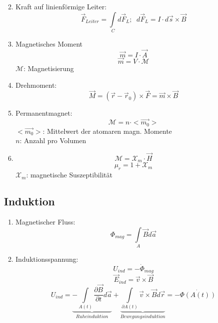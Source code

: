 \documentclass[a4paper,twocolumn,10pt]{article}
\begin{document}
\begin{enumerate}[label=$\bullet$]
\begin{equation*}
\end{equation*}
\item Kraft auf linienförmige Leiter:
\begin{equation*}
\overrightarrow{F}_{Leiter}=\int\limits_{C}d\overrightarrow{F}_L;\;\;d\overrightarrow{F}_L=I\cdot d\overrightarrow{s}\times\overrightarrow{B}
\end{equation*}
\item Magnetisches Moment
\begin{equation*}
\overrightarrow{m}=I\cdot\overrightarrow{A}
\end{equation*}
\begin{equation*}
\overrightarrow{m}=V\cdot\mathcal{M}
\end{equation*}
$\mathcal{M}$: Magnetisierung
\item Drehmoment:
\begin{equation*}
\overrightarrow{M}=(\overrightarrow{r}-\overrightarrow{r}_0)\times\overrightarrow{F}=\overrightarrow{m}\times\overrightarrow{B}
\end{equation*}
\item Permanentmagnet:
\begin{equation*}
\mathcal{M}=n\cdot <\overrightarrow{m_0}>
\end{equation*}
$<\overrightarrow{m_0}>$: Mittelwert der atomaren magn. Momente\\
$n$: Anzahl pro Volumen\\
\item 
\begin{equation*}
\mathcal{M}=\mathcal{X}_m\cdot\overrightarrow{H}
\end{equation*}
\begin{equation*}
\mu_r=1+\mathcal{X}_m
\end{equation*}
$\mathcal{X}_m$: magnetische Suszeptibilität
\end{enumerate}

\subsection{Induktion}
\begin{enumerate}[label=$\bullet$]
\item Magnetischer Fluss:
\begin{equation*}
\Phi_{mag}=\int\limits_{A}\overrightarrow{B}d\overrightarrow{a}
\end{equation*}
\item Induktionsspannung:
\begin{equation*}
U_{ind}=-\dot{\Phi}_{mag}
\end{equation*}
\begin{equation*}
\overrightarrow{E}_{ind}=\overrightarrow{v}\times\overrightarrow{B}
\end{equation*}
\begin{equation*}
U_{ind}=\underbrace{-\int\limits_{A(t)}\frac{\partial \overrightarrow{B}}{\partial t}d\overrightarrow{a}}_{Ruheinduktion}+\underbrace{\int\limits_{\partial A(t)}\overrightarrow{v}\times\overrightarrow{B}d\overrightarrow{r}}_{Bewegungsinduktion}=-\dot{\Phi(A(t))}
\end{equation*}
\end{enumerate}
\end{document}
